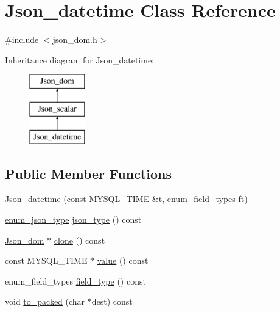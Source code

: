 \hypertarget{classJson__datetime}{}\section{Json\+\_\+datetime Class Reference}
\label{classJson__datetime}


{\ttfamily \#include $<$json\+\_\+dom.\+h$>$}

Inheritance diagram for Json\+\_\+datetime\+:\begin{figure}[H]
\begin{center}
\leavevmode
\includegraphics[height=3.000000cm]{classJson__datetime}
\end{center}
\end{figure}
\subsection*{Public Member Functions}
\begin{DoxyCompactItemize}
\item 
\mbox{\hyperlink{classJson__datetime_a647530c4996bfbdd8c26aef226eaebe8}{Json\+\_\+datetime}} (const M\+Y\+S\+Q\+L\+\_\+\+T\+I\+ME \&t, enum\+\_\+field\+\_\+types ft)
\item 
\mbox{\hyperlink{classJson__dom_af37eed7dfe1da1d6507d3ab85320eb03}{enum\+\_\+json\+\_\+type}} \mbox{\hyperlink{classJson__datetime_af03bb30e76ab42285d3ee4bc66abbc55}{json\+\_\+type}} () const
\item 
\mbox{\hyperlink{classJson__dom}{Json\+\_\+dom}} $\ast$ \mbox{\hyperlink{classJson__datetime_a2c4c37beb0c84fa7cdaeb1c2f28b07c4}{clone}} () const
\item 
const M\+Y\+S\+Q\+L\+\_\+\+T\+I\+ME $\ast$ \mbox{\hyperlink{classJson__datetime_a8d94ebe1237f57e7ffd2bb82621f8f5a}{value}} () const
\item 
enum\+\_\+field\+\_\+types \mbox{\hyperlink{classJson__datetime_a31c8a7a17013d92434f033dbb787df70}{field\+\_\+type}} () const
\item 
void \mbox{\hyperlink{classJson__datetime_a702fc9e31b2a27fe5f99e7daa4ade1f4}{to\+\_\+packed}} (char $\ast$dest) const
\end{DoxyCompactItemize}
